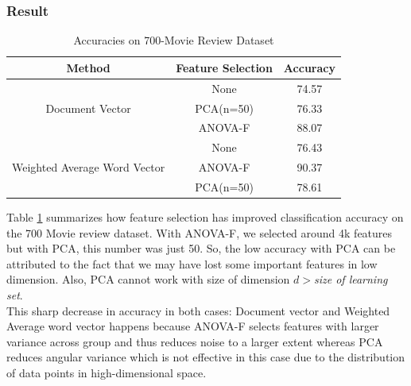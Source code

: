 \documentclass[11pt,a4paper]{article}
\begin{document}
\subsubsection{Result}
\begin{table}[h!]
\centering
\small
\begin{tabular}{|c|c|c|}
\hline
\textbf{Method} & \textbf{Feature Selection} & \textbf{Accuracy} \\ \hline
\multirow{3}{*}{Document Vector}              & None      & 74.57 \\ \cline{2-3} 
                                              & PCA(n=50) & 76.33 \\ \cline{2-3} 
                                              & ANOVA-F & 88.07 \\ \hline
\multirow{3}{*}{Weighted Average Word Vector} & None      & 76.43 \\ \cline{2-3} 
                                              & ANOVA-F   & 90.37 \\ \cline{2-3} 
                                              & PCA(n=50) & 78.61 \\ \hline
\end{tabular}
\caption {Accuracies on 700-Movie Review Dataset}
\label{table:700_movie_features}
\end{table}

Table \ref{table:700_movie_features} summarizes how feature selection has improved classification accuracy on the 700 Movie review dataset. With ANOVA-F, we selected around 4k features but with PCA, this number was just 50. So, the low accuracy with PCA can be attributed to the fact that we may have lost some important features in low dimension. Also, PCA cannot work with size of dimension $d>$\emph{size of learning set}.\\
This sharp decrease in accuracy in both cases: Document vector and Weighted Average word vector happens because ANOVA-F selects features with larger variance across group and thus reduces noise to a larger extent whereas PCA reduces angular variance which is not effective in this case due to the distribution of data points in high-dimensional space.
\end{document}
